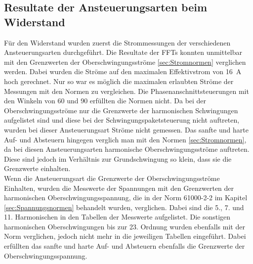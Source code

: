 \subsection{Resultate der Ansteuerungsarten beim Widerstand}
Für den Widerstand wurden zuerst die Strommessungen der verschiedenen Ansteuerungsarten durchgeführt. Die Resultate der FFTs konnten unmittelbar mit den Grenzwerten der Oberschwingungsströme \ref{sec:Stromnormen} verglichen werden. Dabei wurden die Ströme auf den maximalen Effektivstrom von \SI{16}{A} hoch gerechnet. Nur so war es möglich die maximalen erlaubten Ströme der Messungen mit den Normen zu vergleichen. Die Phasenanschnittsteuerungen mit den Winkeln von 60\textdegree \hspace{0.02cm} und 90\textdegree \hspace{0.02cm} erfüllten die Normen nicht. Da bei der Oberschwingungsströme nur die Grenzwerte der harmonischen Schwingungen aufgelistet sind und diese bei der Schwingungspaketsteuerung nicht auftreten, wurden bei dieser Ansteuerungsart Ströme nicht gemessen. Das sanfte und harte Auf- und Absteuern hingegen verglich man mit den Normen \ref{sec:Stromnormen}, da bei diesen Ansteuerungsarten harmonische Oberschwingungsströme auftreten. Diese sind jedoch im Verhältnis zur Grundschwingung so klein, dass sie die Grenzwerte einhalten.\\ 

Wenn die Ansteuerungsart die Grenzwerte der Oberschwingungsströme Einhalten, wurden die Messwerte der Spannungen mit den Grenzwerten der harmonischen Oberschwingungsspannung, die in der Norm 61000-2-2 im Kapitel \ref{sec:Spannungsnormen} behandelt wurden, verglichen. Dabei sind die 5., 7. und 11. Harmonischen in den Tabellen der Messwerte aufgelistet. Die sonstigen harmonischen Oberschwingungen bis zur 23. Ordnung wurden ebenfalls mit der Norm verglichen, jedoch nicht mehr in die jeweiligen Tabellen eingeführt. Dabei erfüllten das sanfte und harte Auf- und Absteuern ebenfalls die Grenzwerte der Oberschwingungsspannung.\\

